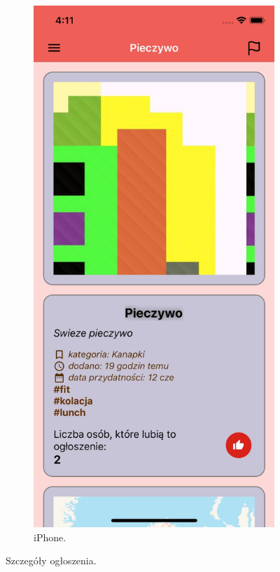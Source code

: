 \documentclass[licencjacka]{pracamgr}
\begin{document}
\begin{figure}[h!]
\begin{subfigure}[b]{0.4\linewidth}
    \includegraphics[width=\linewidth]{ios2.jpg}
    \caption{iPhone.}
  \end{subfigure}
  \caption{Szczegóły ogłoszenia.}
  \label{fig:offers}
\end{figure}
\end{document}
